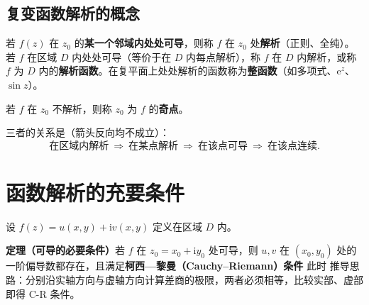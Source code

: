 
\subsection{复变函数解析的概念}
若 \(f(z)\) 在 \(z_{0}\) 的\textbf{某一个邻域内处处可导}，则称 \(f\) 在 \(z_{0}\) 处\textbf{解析}（正则、全纯）。若 \(f\) 在区域 \(D\) 内处处可导（等价于在 \(D\) 内每点解析），称 \(f\) 在 \(D\) 内解析，或称 \(f\) 为 \(D\) 内的\textbf{解析函数}。在复平面上处处解析的函数称为\textbf{整函数}（如多项式、\(\mathrm{e}^{z}\)、\(\sin z\)）。

若 \(f\) 在 \(z_{0}\) 不解析，则称 \(z_{0}\) 为 \(f\) 的\textbf{奇点}。

三者的关系是（箭头反向均不成立）：
\[
\text{在区域内解析}\ \Longrightarrow\ \text{在某点解析}\ \Longrightarrow\ \text{在该点可导}\ \Longrightarrow\ \text{在该点连续}.
\]


\section{函数解析的充要条件}

设 \(f(z)=u(x,y)+\mathrm{i}v(x,y)\) 定义在区域 \(D\) 内。

\textbf{定理（可导的必要条件）}\quad 若 \(f\) 在 \(z_{0}=x_{0}+\mathrm{i}y_{0}\) 处可导，则 \(u,v\) 在 \((x_{0},y_{0})\) 处的一阶偏导数都存在，且满足\textbf{柯西—黎曼（Cauchy--Riemann）条件}
此时
推导思路：分别沿实轴方向与虚轴方向计算差商的极限，两者必须相等，比较实部、虚部即得 C-R 条件。

